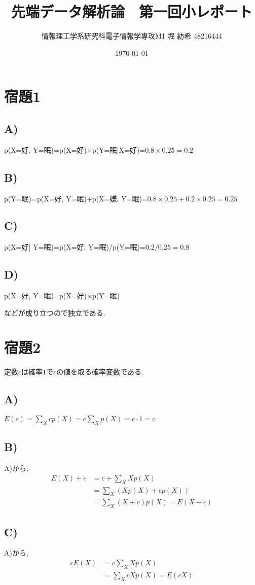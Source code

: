\documentclass[a4paper,11pt]{jsarticle}
\begin{document}
  \title{先端データ解析論　第一回小レポート}
  \author{情報理工学系研究科電子情報学専攻M1 堀 紡希 48216444}
  \date{\today}
  \maketitle

  \section*{宿題1}
  \subsection*{A)}
  p(X=好, Y=眠)=p(X=好)$\times$p(Y=眠|X=好)=$0.8\times 0.25 = 0.2$
  \subsection*{B)}
  p(Y=眠)=p(X=好, Y=眠)+p(X=嫌, Y=眠)=$0.8\times 0.25 + 0.2\times 0.25 = 0.25$

  \subsection*{C)}
  p(X=好| Y=眠)=p(X=好, Y=眠)/p(Y=眠)=$0.2/ 0.25 = 0.8$
  \subsection*{D)}
  p(X=好, Y=眠)=p(X=好)$\times$p(Y=眠)

  などが成り立つので独立である.
  \section*{宿題2}
  定数$c$は確率$1$で$c$の値を取る確率変数である.
  \subsection*{A)}
  $E(c) = \sum _X cp(X) = c\sum _X p(X)= c\cdot 1 = c$
  \subsection*{B)}
  A)から, 
  \begin{align*}
  E(X)+c &= c + \sum_{X} Xp(X) \\
  &= \sum_{X} (Xp(X) + cp(X)) \\
  &= \sum_{X} (X+c)p(X) = E(X+c)
  \end{align*}
  \subsection*{C)}
  A)から, 
  \begin{align*}
  cE(X) &= c  \sum_{X} Xp(X) \\
  &= \sum_{X} cXp(X)  = E(cX)
  \end{align*}
\end{document}
